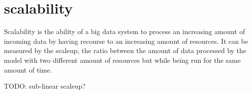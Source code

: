 \section{scalability}

Scalability is the ability of a big data system to process
an increasing amount of incoming data by having recourse
to an increasing amount of resources. It can be measured
by the scaleup, the ratio between the amount of data processed
by the model with two different amount of resources but
while being run for the same amount of time.

TODO: sub-linear scaleup?
